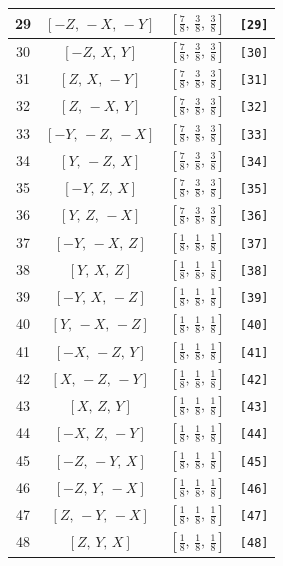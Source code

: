 \documentclass[fleqn,8pt]{jsarticle}
\begin{document}
\begin{longtable}{cccc}
29 & $\left[ - Z,\, - X,\, - Y \right]$ & $\left[ \frac{7}{8},\, \frac{3}{8},\, \frac{3}{8} \right]$ & {\tt [29]} \\ \hline
30 & $\left[ - Z,\, X,\, Y \right]$ & $\left[ \frac{7}{8},\, \frac{3}{8},\, \frac{3}{8} \right]$ & {\tt [30]} \\ \hline
31 & $\left[ Z,\, X,\, - Y \right]$ & $\left[ \frac{7}{8},\, \frac{3}{8},\, \frac{3}{8} \right]$ & {\tt [31]} \\ \hline
32 & $\left[ Z,\, - X,\, Y \right]$ & $\left[ \frac{7}{8},\, \frac{3}{8},\, \frac{3}{8} \right]$ & {\tt [32]} \\ \hline
33 & $\left[ - Y,\, - Z,\, - X \right]$ & $\left[ \frac{7}{8},\, \frac{3}{8},\, \frac{3}{8} \right]$ & {\tt [33]} \\ \hline
34 & $\left[ Y,\, - Z,\, X \right]$ & $\left[ \frac{7}{8},\, \frac{3}{8},\, \frac{3}{8} \right]$ & {\tt [34]} \\ \hline
35 & $\left[ - Y,\, Z,\, X \right]$ & $\left[ \frac{7}{8},\, \frac{3}{8},\, \frac{3}{8} \right]$ & {\tt [35]} \\ \hline
36 & $\left[ Y,\, Z,\, - X \right]$ & $\left[ \frac{7}{8},\, \frac{3}{8},\, \frac{3}{8} \right]$ & {\tt [36]} \\ \hline
37 & $\left[ - Y,\, - X,\, Z \right]$ & $\left[ \frac{1}{8},\, \frac{1}{8},\, \frac{1}{8} \right]$ & {\tt [37]} \\ \hline
38 & $\left[ Y,\, X,\, Z \right]$ & $\left[ \frac{1}{8},\, \frac{1}{8},\, \frac{1}{8} \right]$ & {\tt [38]} \\ \hline
39 & $\left[ - Y,\, X,\, - Z \right]$ & $\left[ \frac{1}{8},\, \frac{1}{8},\, \frac{1}{8} \right]$ & {\tt [39]} \\ \hline
40 & $\left[ Y,\, - X,\, - Z \right]$ & $\left[ \frac{1}{8},\, \frac{1}{8},\, \frac{1}{8} \right]$ & {\tt [40]} \\ \hline
41 & $\left[ - X,\, - Z,\, Y \right]$ & $\left[ \frac{1}{8},\, \frac{1}{8},\, \frac{1}{8} \right]$ & {\tt [41]} \\ \hline
42 & $\left[ X,\, - Z,\, - Y \right]$ & $\left[ \frac{1}{8},\, \frac{1}{8},\, \frac{1}{8} \right]$ & {\tt [42]} \\ \hline
43 & $\left[ X,\, Z,\, Y \right]$ & $\left[ \frac{1}{8},\, \frac{1}{8},\, \frac{1}{8} \right]$ & {\tt [43]} \\ \hline
44 & $\left[ - X,\, Z,\, - Y \right]$ & $\left[ \frac{1}{8},\, \frac{1}{8},\, \frac{1}{8} \right]$ & {\tt [44]} \\ \hline
45 & $\left[ - Z,\, - Y,\, X \right]$ & $\left[ \frac{1}{8},\, \frac{1}{8},\, \frac{1}{8} \right]$ & {\tt [45]} \\ \hline
46 & $\left[ - Z,\, Y,\, - X \right]$ & $\left[ \frac{1}{8},\, \frac{1}{8},\, \frac{1}{8} \right]$ & {\tt [46]} \\ \hline
47 & $\left[ Z,\, - Y,\, - X \right]$ & $\left[ \frac{1}{8},\, \frac{1}{8},\, \frac{1}{8} \right]$ & {\tt [47]} \\ \hline
48 & $\left[ Z,\, Y,\, X \right]$ & $\left[ \frac{1}{8},\, \frac{1}{8},\, \frac{1}{8} \right]$ & {\tt [48]} \\
\end{longtable}
\end{document}

